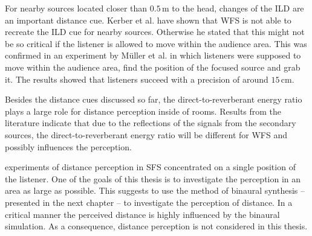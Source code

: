 For nearby sources located closer than $0.5$\,m to the head, changes of the
\ac{ILD} are an important distance cue.\autocite{Brungart1999}
Kerber et al. have shown that \ac{WFS} is not able to recreate the \ac{ILD}
cue for nearby sources.\autocite{Kerber2004}
Otherwise he stated that this might not be so critical if the listener is allowed to
move within the audience area. This was confirmed in an experiment by Müller
et al. in which listeners were supposed to move within the audience area, find the
position of the focused source and grab it.\autocite{Muller2014} The results showed
that listeners succeed with a precision of around $15$\,cm.

Besides the distance cues discussed so far, the direct-to-reverberant energy
ratio plays a large role for distance perception inside of
rooms.\autocite{Bronkhorst1999}
Results from the literature indicate that due to the reflections of the signals
from the secondary sources, the direct-to-reverberant energy ratio will be
different for \ac{WFS} and possibly influences the perception.\autocite{Volk2010a}

 experiments of distance perception in \ac{SFS}
concentrated on a
single position of the listener. One of the goals of this thesis is to investigate the
perception in an area as large as possible. This suggests to use the method of
binaural synthesis -- presented in the next chapter -- to investigate the
perception of distance. In a critical manner the perceived distance is highly
influenced by the binaural simulation.
As a consequence, distance perception is not considered in this thesis.


